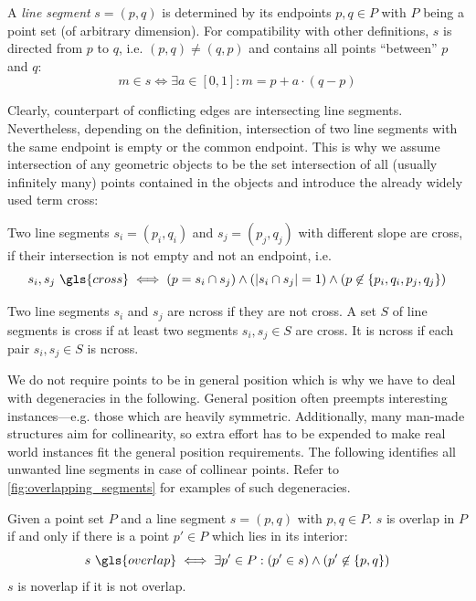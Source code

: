 \begin{definition}
  A \emph{line segment} \(s=(p,q)\) is determined by its endpoints
  \(p,q\in P\) with \(P\) being a point set (of arbitrary dimension). 
  For compatibility with other definitions,
  \(s\) is directed from \(p\) to \(q\), i.e. \((p,q)\not=(q,p)\)
  and contains all points ``between'' \(p\) and \(q\):
  \[ m \in s \iff \exists a\in [0,1] : m = p + a \cdot (q-p) \]
\end{definition}

Clearly, counterpart of conflicting edges are intersecting line
segments. Nevertheless, depending on the definition, intersection of
two line segments with the same endpoint is empty or the common endpoint.
This is why we assume intersection of any geometric objects to be the
set intersection of all (usually infinitely many) points contained in
the objects and introduce the already widely used term \gls{cross}:

\begin{definition}[Crossing]\label{def:crossing}
  Two line segments \(s_i=(p_i,q_i)\) and \(s_j=(p_j,q_j)\) with 
  different slope are \gls{cross}, if their intersection is not empty
  and not an endpoint, i.e.
  \[
    s_i, s_j~\gls{cross}
    \iff
    (p = s_i\cap s_j) \land
    (|s_i\cap s_j| = 1) \land
    (p \not\in \{p_i,q_i,p_j,q_j\})
  \]

  Two line segments \(s_i\) and \(s_j\) are \gls{ncross}
  if they are not \gls{cross}.
  A set \(S\) of line segments is \gls{cross}
  if at least two segments \(s_i, s_j \in S\) are \gls{cross}.
  It is \gls{ncross} if each pair \(s_i, s_j \in S\) is \gls{ncross}.
\end{definition}

We do not require points to be in general position which is why we
have to deal with degeneracies in the following. General position
often preempts interesting instances---e.g. those which are heavily
symmetric. Additionally, many man-made structures aim for
collinearity, so extra effort has to be expended to make real world
instances fit the general position requirements. The following
 identifies all unwanted line
segments in case of collinear points. Refer to
\cref{fig:overlapping_segments} for examples of such degeneracies.

\begin{definition}
  \label{def:overlapping_segments}
  Given a point set \(P\) and a line segment \(s = (p,q)\) with
  \(p,q \in P\). \(s\) is \gls{overlap} in \(P\) if and only if
  there is a point \(p' \in P\) which lies in its interior:
  \[
    s~\gls{overlap}
    \iff  \exists p' \in P : (p' \in s) \land (p' \not\in \{p,q\})
  \]
  \(s\) is \gls{noverlap} if it is not \gls{overlap}.
\end{definition}

